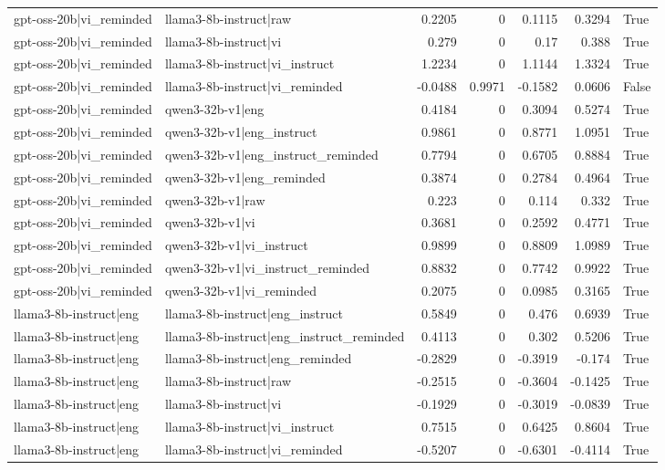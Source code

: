 \begin{table}
\begin{tabular}{l l r r r r l}
gpt-oss-20b|vi_reminded & llama3-8b-instruct|raw & 0.2205 & 0 & 0.1115 & 0.3294 & True \\
gpt-oss-20b|vi_reminded & llama3-8b-instruct|vi & 0.279 & 0 & 0.17 & 0.388 & True \\
gpt-oss-20b|vi_reminded & llama3-8b-instruct|vi_instruct & 1.2234 & 0 & 1.1144 & 1.3324 & True \\
gpt-oss-20b|vi_reminded & llama3-8b-instruct|vi_reminded & -0.0488 & 0.9971 & -0.1582 & 0.0606 & False \\
gpt-oss-20b|vi_reminded & qwen3-32b-v1|eng & 0.4184 & 0 & 0.3094 & 0.5274 & True \\
gpt-oss-20b|vi_reminded & qwen3-32b-v1|eng_instruct & 0.9861 & 0 & 0.8771 & 1.0951 & True \\
gpt-oss-20b|vi_reminded & qwen3-32b-v1|eng_instruct_reminded & 0.7794 & 0 & 0.6705 & 0.8884 & True \\
gpt-oss-20b|vi_reminded & qwen3-32b-v1|eng_reminded & 0.3874 & 0 & 0.2784 & 0.4964 & True \\
gpt-oss-20b|vi_reminded & qwen3-32b-v1|raw & 0.223 & 0 & 0.114 & 0.332 & True \\
gpt-oss-20b|vi_reminded & qwen3-32b-v1|vi & 0.3681 & 0 & 0.2592 & 0.4771 & True \\
gpt-oss-20b|vi_reminded & qwen3-32b-v1|vi_instruct & 0.9899 & 0 & 0.8809 & 1.0989 & True \\
gpt-oss-20b|vi_reminded & qwen3-32b-v1|vi_instruct_reminded & 0.8832 & 0 & 0.7742 & 0.9922 & True \\
gpt-oss-20b|vi_reminded & qwen3-32b-v1|vi_reminded & 0.2075 & 0 & 0.0985 & 0.3165 & True \\
llama3-8b-instruct|eng & llama3-8b-instruct|eng_instruct & 0.5849 & 0 & 0.476 & 0.6939 & True \\
llama3-8b-instruct|eng & llama3-8b-instruct|eng_instruct_reminded & 0.4113 & 0 & 0.302 & 0.5206 & True \\
llama3-8b-instruct|eng & llama3-8b-instruct|eng_reminded & -0.2829 & 0 & -0.3919 & -0.174 & True \\
llama3-8b-instruct|eng & llama3-8b-instruct|raw & -0.2515 & 0 & -0.3604 & -0.1425 & True \\
llama3-8b-instruct|eng & llama3-8b-instruct|vi & -0.1929 & 0 & -0.3019 & -0.0839 & True \\
llama3-8b-instruct|eng & llama3-8b-instruct|vi_instruct & 0.7515 & 0 & 0.6425 & 0.8604 & True \\
llama3-8b-instruct|eng & llama3-8b-instruct|vi_reminded & -0.5207 & 0 & -0.6301 & -0.4114 & True \\

\end{tabular}
\end{table}
